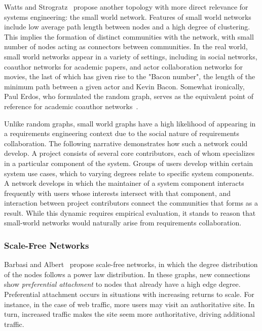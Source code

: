 Watts and Strogratz~\cite{watts} propose another topology with more direct relevance for systems engineering: the small world network. Features of small world networks include low average path length between nodes and a high degree of clustering. This implies the formation of distinct communities with the network, with small number of nodes acting as connectors between communities. In the real world, small world networks appear in a variety of settings, including in social networks, coauthor networks for academic papers, and actor collaboration networks for movies, the last of which has given rise to the "Bacon number", the length of the minimum path between a given actor and Kevin Bacon. Somewhat ironically, Paul Erdos, who formulated the random graph, serves as the equivalent point of reference for academic coauthor networks~\cite{barbasi}.

Unlike random graphs, small world graphs have a high likelihood of appearing in a requirements engineering context due to the social nature of requirements collaboration. The following narrative demonstrates how such a network could develop. A project consists of several core contributors, each of whom specializes in a particular component of the system. Groups of users develop within certain system use cases, which to varying degrees relate to specific system components. A network develops in which the maintainer of a system component interacts frequently with users whose interests intersect with that component, and interaction between project contributors connect the communities that forms as a result. While this dynamic requires empirical evaluation, it stands to reason that small-world networks would naturally arise from requirements collaboration.

\subsubsection{Scale-Free Networks}

Barbasi and Albert~\cite{barbasi2} propose scale-free networks, in which the degree distribution of the nodes follows a power law distribution. In these graphs, new connections show \emph{preferential attachment} to nodes that already have a high edge degree. Preferential attachment occurs in situations with increasing returns to scale. For instance, in the case of web traffic, more users may visit an authoritative site. In turn, increased traffic makes the site seem more authoritative, driving additional traffic.

